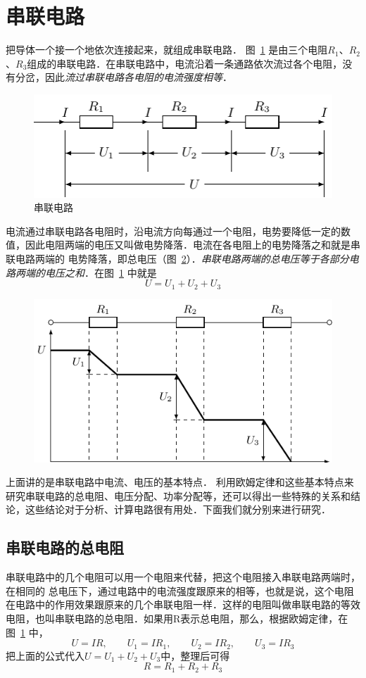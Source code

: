 \section{串联电路}
把导体一个接一个地依次连接起来，就组成串联电路．
图~\ref{fig_B_7-5} 是由三个电阻$R_1$、$R_2$、$R_3$组成的串联电路．在串联电路中，电流沿着一条通路依次流过各个电阻，没有分岔，因此\textit{流过串联电路各电阻的电流强度相等}．
\begin{figure}[htbp]
    \centering
    \includegraphics{fig/B/7-5.pdf}
    \caption{串联电路}\label{fig_B_7-5}
\end{figure}	

电流通过串联电路各电阻时，沿电流方向每通过一个电阻，电势要降低一定的数值，因此电阻两端的电压又叫做电势降落．电流在各电阻上的电势降落之和就是串联电路两端的
电势降落，即总电压（图~\ref{fig_B_7-6}）．\textit{串联电路两端的总电压等于各部分电路两端的电压之和}．在图~\ref{fig_B_7-5} 中就是
\[U=U_1+U_2+U_3\]
\begin{figure}[htbp]
    \centering
    \includegraphics{fig/B/7-6.pdf}
    \caption{}\label{fig_B_7-6}
\end{figure}


上面讲的是串联电路中电流、电压的基本特点．
利用欧姆定律和这些基本特点来研究串联电路的总电阻、电压分配、功率分配等，还可以得出一些特殊的关系和结论，这些结论对于分析、计算电路很有用处．下面我们就分别来进行研究．

\subsection{串联电路的总电阻} 
串联电路中的几个电阻可以用一个电阻来代替，把这个电阻接入串联电路两端时，在相同的
总电压下，通过电路中的电流强度跟原来的相等，也就是说，这个电阻在电路中的作用效果跟原来的几个串联电阻一样．这样的电阻叫做串联电路的等效电阻，也叫串联电路的总电阻．如果用R表示总电阻，那么，根据欧姆定律，在图~\ref{fig_B_7-5} 中，
\[U=IR,\qquad  U_1=IR_1,\qquad U_2=IR_2,\qquad U_3=IR_3\]
把上面的公式代入$U=U_1+U_2+U_3$中，整理后可得
\[R=R_1+R_2+R_3\]

